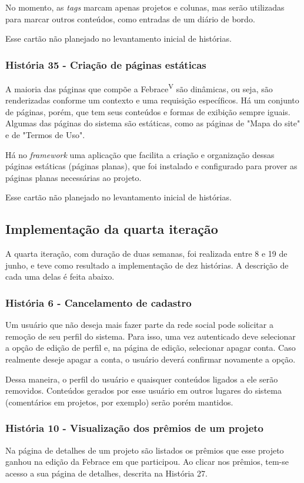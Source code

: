       No momento, as \textit{tags} marcam apenas projetos e colunas, mas serão utilizadas para marcar outros conteúdos, como entradas de um diário de bordo.

  Esse cartão não planejado no levantamento inicial de histórias.

    \subsubsection{História 35 - Criação de páginas estáticas}
      A maioria das páginas que compõe a Febrace\textsuperscript{V} são dinâmicas, ou seja, são renderizadas conforme um contexto e uma requisição específicos. Há um conjunto de páginas, porém, que tem seus conteúdos e formas de exibição sempre iguais. Algumas das páginas do sistema são estáticas, como as páginas de "Mapa do site" e de "Termos de Uso".

      Há no \textit{framework} uma aplicação que facilita a criação e organização dessas páginas estáticas (páginas planas), que foi instalado e configurado para prover as páginas planas necessárias ao projeto.

  Esse cartão não planejado no levantamento inicial de histórias.

  \subsection{Implementação da quarta iteração}
    A quarta iteração, com duração de duas semanas, foi realizada entre 8 e 19 de junho, e teve como resultado a implementação de dez histórias. A descrição de cada uma delas é feita abaixo.

    \subsubsection{História 6 - Cancelamento de cadastro}
      Um usuário que não deseja mais fazer parte da rede social pode solicitar a remoção de seu perfil do sistema. Para isso, uma vez autenticado deve selecionar a opção de edição de perfil e, na página de edição, selecionar apagar conta. Caso realmente deseje apagar a conta, o usuário deverá confirmar novamente a opção.

      Dessa maneira, o perfil do usuário e quaisquer conteúdos ligados a ele serão removidos. Conteúdos gerados por esse usuário em outros lugares do sistema (comentários em projetos, por exemplo) serão porém mantidos.

    \subsubsection{História 10 - Visualização dos prêmios de um projeto}
      Na página de detalhes de um projeto são listados os prêmios que esse projeto ganhou na edição da Febrace em que participou. Ao clicar nos prêmios, tem-se acesso a sua página de detalhes, descrita na História 27.

